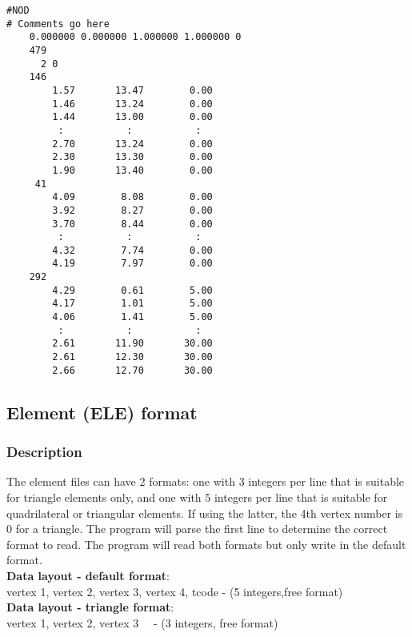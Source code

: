 \documentclass{article}
\begin{document}
\begin{small}
\begin{lstlisting}
#NOD 
# Comments go here
    0.000000 0.000000 1.000000 1.000000 0 
    479
      2 0
    146
        1.57       13.47        0.00
        1.46       13.24        0.00
        1.44       13.00        0.00
         :           :           :
        2.70       13.24        0.00
        2.30       13.30        0.00
        1.90       13.40        0.00
     41
        4.09        8.08        0.00
        3.92        8.27        0.00
        3.70        8.44        0.00
         :           :           :
        4.32        7.74        0.00
        4.19        7.97        0.00
    292
        4.29        0.61        5.00
        4.17        1.01        5.00
        4.06        1.41        5.00
         :           :           :
        2.61       11.90       30.00
        2.61       12.30       30.00
        2.66       12.70       30.00
\end{lstlisting}
\end{small}

\newpage
\subsection[Element (ELE) format]{Element (ELE) format}

\subsubsection[Description]{Description}

The element files can have 2 formats: one with 3 integers per line that is suitable for
triangle elements only, and one with 5 integers per line that is suitable for 
quadrilateral or triangular elements. If using the latter, the 4th vertex number
is 0 for a triangle. The program will parse the first line
to determine the correct format to read. The program will read both formats but only write in the default format. \\

\textbf{Data layout - default format}: \\ 

\noindent
vertex 1, vertex 2, vertex 3, vertex 4, tcode - (5 integers,free format) \\

\textbf{Data layout - triangle format}: \\ 

\noindent
vertex 1, vertex 2, vertex 3 \ \ {}- (3 integers, free format)\newline
\end{document}
